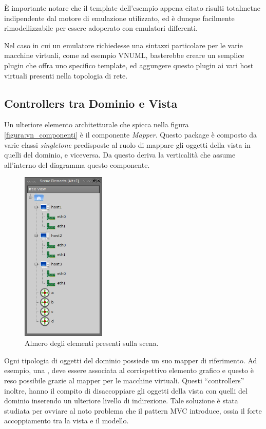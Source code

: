 È importante notare che il template dell'esempio appena citato risulti totalmetne indipendente dal motore di emulazione utilizzato, ed è dunque facilmente rimodellizzabile per essere adoperato con emulatori differenti.

Nel caso in cui un emulatore richiedesse una sintazzi particolare per le varie macchine virtuali, come ad esempio VNUML, basterebbe creare un semplice plugin che offra uno specifico template, ed aggungere questo plugin ai vari host virtuali presenti nella topologia di rete.

\subsection{Controllers tra Dominio e Vista}
Un ulteriore elemento architetturale che spicca nella figura \ref{figura:vn_componenti} è il componente \emph{Mapper}. Questo package è composto da varie classi \emph{singletone} predisposte al ruolo di mappare gli oggetti della vista in quelli del dominio, e viceversa. Da questo deriva la verticalità che assume all'interno del diagramma questo componente.

\begin{figure}[!htb]
	\centering
	\includegraphics[width=4cm]{images/visualnetkit_tree_elements.png}
	\caption{Almero degli elementi presenti sulla scena.}
	\label{figura:scene_elements}
\end{figure}

Ogni tipologia di oggetti del dominio possiede un suo mapper di riferimento. Ad esempio, una \virtualmachine{}, deve essere associata al corrispettivo elemento grafico e questo è reso possibile grazie al mapper per le macchine virtuali. Questi ``controllers'' inoltre, hanno il compito di disaccoppiare gli oggetti della vista con quelli del dominio inserendo un ulteriore livello di indirezione. Tale soluzione è stata studiata per ovviare al noto problema che il pattern MVC introduce, ossia il forte accoppiamento tra la vista e il modello.

